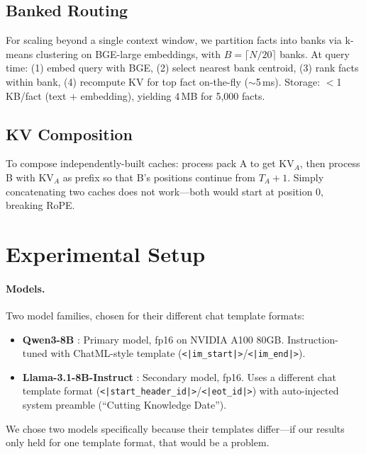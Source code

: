 \documentclass{article}
\begin{document}
\subsection{Banked Routing}

For scaling beyond a single context window, we partition facts into banks via k-means clustering on BGE-large embeddings, with $B = \lceil N/20 \rceil$ banks. At query time: (1) embed query with BGE, (2) select nearest bank centroid, (3) rank facts within bank, (4) recompute KV for top fact on-the-fly (${\sim}$5\,ms). Storage: $<$1\,KB/fact (text + embedding), yielding 4\,MB for 5{,}000 facts.

\subsection{KV Composition}

To compose independently-built caches: process pack A to get $\text{KV}_A$, then process B with $\text{KV}_A$ as prefix so that B's positions continue from $T_A{+}1$. Simply concatenating two caches does not work---both would start at position 0, breaking RoPE.

\section{Experimental Setup}

\paragraph{Models.} Two model families, chosen for their different chat template formats:
\begin{itemize}
    \item \textbf{Qwen3-8B} \citep{qwen3}: Primary model, fp16 on NVIDIA A100 80GB. Instruction-tuned with ChatML-style template (\texttt{<|im\_start|>}/\texttt{<|im\_end|>}).
    \item \textbf{Llama-3.1-8B-Instruct} \citep{dubey2024llama3}: Secondary model, fp16. Uses a different chat template format (\texttt{<|start\_header\_id|>}/\texttt{<|eot\_id|>}) with auto-injected system preamble (``Cutting Knowledge Date'').
\end{itemize}
We chose two models specifically because their templates differ---if our results only held for one template format, that would be a problem.
\end{document}
